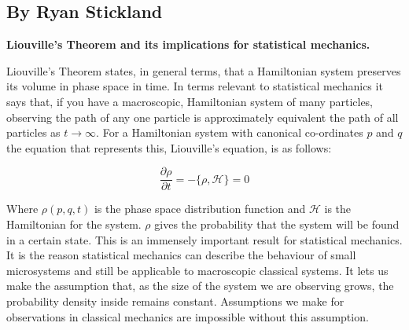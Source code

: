 \subsection{By Ryan Stickland} 
{\bf Liouville's Theorem and its implications for statistical mechanics.}

Liouville's Theorem states, in general terms, that a Hamiltonian system preserves its volume in phase space in time. In terms relevant to statistical mechanics it says that, if you have a macroscopic, Hamiltonian system of many particles, observing the path of any one particle is approximately equivalent the path of all particles as $t\to\infty$. For a Hamiltonian system with canonical co-ordinates $p$ and $q$ the equation that represents this, Liouville’s equation, is as follows:

$$\frac{\partial\rho}{\partial t}=-\{\rho,\mathcal{H}\}=0$$

Where $\rho(p,q,t)$ is the phase space distribution function and $\mathcal{H}$ is the Hamiltonian for the system. $\rho$ gives the probability that the system will be found in a certain state. This is an immensely important result for statistical mechanics. It is the reason statistical mechanics can describe the behaviour of small microsystems and still be applicable to macroscopic classical systems. It lets us make the assumption that, as the size of the system we are observing grows, the probability density inside remains constant. Assumptions we make for observations in classical mechanics are impossible without this assumption.
